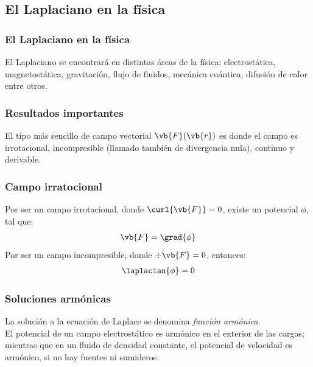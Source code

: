 \subsection{El Laplaciano en la física}
\begin{frame}
\frametitle{El Laplaciano en la física}
El Laplaciano se encontrará en distintas áreas de la física: electrostática, magnetostática, gravitación, flujo de fluidos, mecánica cuántica, difusión de calor entre otros.
\end{frame}
\begin{frame}
\frametitle{Resultados importantes}
El tipo más sencillo de campo vectorial $\vb{F}(\vb{r})$ es donde el campo es irrotacional, incompresible (llamado también de divergencia nula), continuo y derivable.
\end{frame}
\begin{frame}
\frametitle{Campo irratocional}
Por ser un campo irrotacional, donde $\curl{\vb{F}} = 0$, existe un potencial $\phi$, tal que:
\begin{align*}
\vb{F} = \grad{\phi}
\end{align*}
\pause
Por ser un campo incompresible, donde $\div{\vb{F}} = 0$, entonces:
\begin{align*}
\laplacian{\phi} = 0
\end{align*}
\end{frame}
\begin{frame}
\frametitle{Soluciones armónicas}
La solución a la ecuación de Laplace se denomina \emph{función armónica}.
\\
\bigskip
\pause
El potencial de un campo electrostático es armónico en el exterior de las cargas; mientras que en un fluido de densidad constante, el potencial de velocidad es armónico, si no hay fuentes ni sumideros.
\end{frame}
